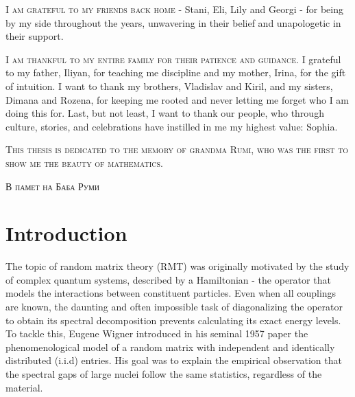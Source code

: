 \documentclass[11pt]{article}
\begin{document}
\begin{center}
{\noindent \textsc{I am grateful to my friends back home} - Stani, Eli, Lily and Georgi - for being by my side throughout the years, unwavering in their belief and unapologetic in their support.\vspace{0.25 cm}

\noindent \textsc{I am thankful to my entire family for their patience and guidance.} I grateful to my father, Iliyan, for teaching me discipline and my mother, Irina, for the gift of intuition. I want to thank my brothers, Vladislav and Kiril, and my sisters, Dimana and Rozena, for keeping me rooted and never letting me forget who I am doing this for. Last, but not least, I want to thank our people, who through culture, stories, and celebrations have instilled in me my highest value: Sophia.\vspace{0.25 cm}

\noindent \textsc{This thesis is dedicated to the memory of grandma Rumi, who was the first to show me the beauty of mathematics.}}

\end{center}

\newpage

\vspace*{10 cm}
\begin{center}
\Large{\textsc{В памет на Баба Руми}}
\thispagestyle{empty}
\end{center}

\newpage
\tableofcontents
\clearpage

\setcounter{page}{1}
\section{Introduction}
\label{sec:intro}
The topic of random matrix theory (RMT) was originally motivated by the study of complex quantum systems, described by a Hamiltonian  - the operator that models the interactions between constituent particles. Even when all couplings are known, the daunting and often impossible task of diagonalizing the operator to obtain its spectral decomposition prevents calculating its exact energy levels. To tackle this, Eugene Wigner introduced in his seminal 1957 paper \cite{wigner} the phenomenological model of a random matrix with independent and identically distributed (i.i.d) entries. His goal was to explain the empirical observation that the spectral gaps of large nuclei follow the same statistics, regardless of the material. 
\end{document}
